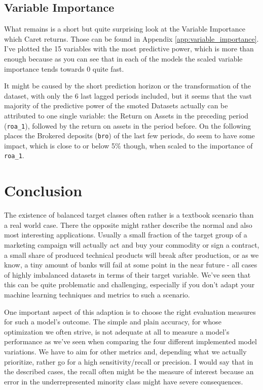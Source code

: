 \documentclass[12pt,a4paper]{article}
\begin{document}
\subsection{Variable Importance}
What remains is a short but quite surprising look at the Variable Importance which Caret returns. Those can be found in Appendix \ref{app:variable_importance}. I've plotted the 15 variables with the most predictive power, which is more than enough because as you can see that in each of the models the scaled variable importance tends towards 0 quite fast. 

It might be caused by the short prediction horizon or the transformation of the dataset, with only the 6 last lagged periods included, but it seems that the vast majority of the predictive power of the smoted Datasets actually can be attributed to one single variable: the Return on Assets in the preceding period (\verb+roa_1+), followed by the return on assets in the period before. On the following places the Brokered deposits (\verb+bro+) of the last few periods, do seem to have some impact, which is close to or below 5\% though, when scaled to the importance of \verb+roa_1+.
\section{Conclusion}
The existence of balanced target classes often rather is a textbook scenario than a real world case. There the opposite might rather describe the normal and also most interesting applications. Usually a small fraction of the target group of a marketing campaign will actually act and buy your commodity or sign a contract, a small share of produced technical products will break after production, or as we know, a tiny amount of banks will fail at some point in the near future - all cases of highly imbalanced datasets in terms of their target variable. We've seen that this can be quite problematic and challenging, especially if you don't adapt your machine learning techniques and metrics to such a scenario. 

One important aspect of this adaption is to choose the right evaluation measures for such a model's outcome. The simple and plain accuracy, for whose optimization we often strive, is not adequate at all to measure a model's performance as we've seen when comparing the four different implemented model variations. We have to aim for other metrics and, depending what we actually prioritize, rather go for a high sensitivity/recall or precision. I would say that in the described cases, the recall often might be the measure of interest because an error in the underrepresented minority class might have severe consequences.
\end{document}
